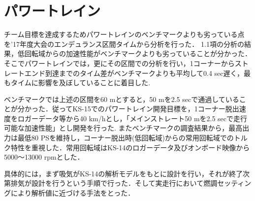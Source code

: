 \section{パワートレイン}
チーム目標を達成するためパワートレインのベンチマークよりも劣っている点を’17年度大会のエンデュランス区間タイムから分析を行った．
1.1項の分析の結果，低回転域からの加速性能がベンチマークよりも劣っていることが分かった．そこでパワートレインでは，更にその区間での分析を行い，1コーナーからストレートエンド到達までのタイム差がベンチマークよりも平均して0.4 sec遅く，最もタイムに影響を及ぼしていることに着目した.

ベンチマークでは上述の区間を60 mとすると，50 mを2.5 secで通過していることが分かった．従ってKS-15でのパワートレイン開発目標を，1コーナー脱出速度をロガーデータ等から40 km/hとし，「メインストレート50 mを2.5 secで走行可能な加速性能」とし開発を行った. 
またベンチマークの調査結果から，最高出力は最低80 PSを維持し，コーナー脱出時(低回転域)からの常用回転域でのトルク特性を重視した．常用回転域はKS-14のロガーデータ及びオンボード映像から5000～13000 rpmとした．

具体的には，まず吸気がKS-14の解析モデルをもとに設計を行い，それが終了次第排気が設計を行うという手順で行った．そして実走行において燃調セッティングにより解析値に近づける手法をとった．












